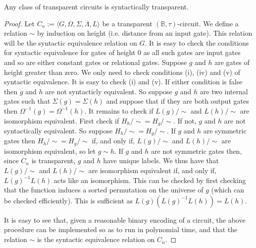 \documentclass[../paper.tex]{subfiles}
\begin{document}
\begin{prop}
  Any class of transparent circuits is syntactically transparent.
  \label{prop:unique-labels-syntactic-equiv}
\end{prop}
\begin{proof} Let $C_n := \langle G, \Omega, \Sigma, \Lambda, L \rangle$ be a
  transparent $(\mathbb{B}, \tau)$-circuit. We define a relation $\sim$ by
  induction on height (i.e. distance from an input gate). This relation will be
  the syntactic equivalence relation on $G$. It is easy to check the conditions
  for syntactic equivalence for gates of height 0 as all such gates are input
  gates and so are either constant gates or relational gates. Suppose $g$ and
  $h$ are gates of height greater than zero. We only need to check conditions
  (i), (iv) and (v) of syntactic equivalence. It is easy to check (i) and (v).
  If either condition is false then $g$ and $h$ are not syntacticly equivalent.
  So suppose $g$ and $h$ are two internal gates such that $\Sigma (g) =
  \Sigma(h)$ and suppose that if they are both output gates then $\Omega^{-1}(g)
  = \Omega^{-1}(h)$. It remains to check if $L(g)/{\sim}$ and $L(h)/{\sim}$ are
  isomorphism equivalent. First check if $H_h /{\sim} = H_g /{\sim}$. If not,
  $g$ and $h$ are not syntactically equivalent. So suppose $H_h /{\sim} = H_g
  /{\sim}$. If $g$ and $h$ are symmetric gates then $H_h /{\sim} = H_g/{\sim}$
  if, and only if, $L(g)/{\sim}$ and $L(h)/{\sim}$ are isomorphism equivalent,
  so let $g \sim h$. If $g$ and $h$ are not symmetric gates then, since $C_n$ is
  transparent, $g$ and $h$ have unique labels. We thus have that $L(g)/{\sim}$
  and $L(h)/{\sim}$ are isomorphism equivalent if, and only if, $L(g)^{-1}L(h)$
  acts like an isomorphism. This can be checked by first checking that the
  function induces a sorted permutation on the universe of $g$ (which can be
  checked efficiently). This is sufficient as $L(g)(L(g)^{-1}L(h)) = L(h)$.

  It is easy to see that, given a reasonable binary encoding of a circuit, the
  above procedure can be implemented so as to run in polynomial time, and that
  the relation $\sim$ is the syntactic equivalence relation on $C_n$.
\end{proof}
\end{document}
